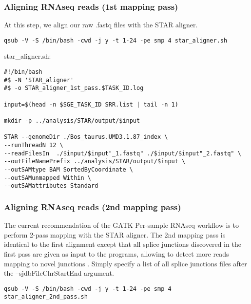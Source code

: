 \subsubsection{Aligning RNAseq reads (1st mapping pass)}

At this step, we align our raw .fastq files with the STAR aligner.

\begin{verbatim}
qsub -V -S /bin/bash -cwd -j y -t 1-24 -pe smp 4 star_aligner.sh
\end{verbatim}


\noindent star\_aligner.sh:
\begin{verbatim}
#!/bin/bash
#$ -N 'STAR_aligner'
#$ -o STAR_aligner_1st_pass.$TASK_ID.log

input=$(head -n $SGE_TASK_ID SRR.list | tail -n 1)

mkdir -p ../analysis/STAR/output/$input

STAR --genomeDir ./Bos_taurus.UMD3.1.87_index \
--runThreadN 12 \
--readFilesIn  ./$input/$input"_1.fastq" ./$input/$input"_2.fastq" \
--outFileNamePrefix ../analysis/STAR/output/$input \
--outSAMtype BAM SortedByCoordinate \
--outSAMunmapped Within \
--outSAMattributes Standard
\end{verbatim}



\subsubsection{Aligning RNAseq reads (2nd mapping pass)}

The current recommendation of the GATK Per-sample RNAseq  workflow is to perform 2-pass mapping with the STAR aligner. The 2nd mapping pass is identical to the first alignment except that all splice junctions discovered in the first pass are given as input to the programs, allowing to detect more reads mapping to novel junctions  \cite{Dobin2013}. Simply specify a list of all splice junctions files after the --sjdbFileChrStartEnd argument.


\begin{verbatim}
qsub -V -S /bin/bash -cwd -j y -t 1-24 -pe smp 4 star_aligner_2nd_pass.sh
\end{verbatim}

